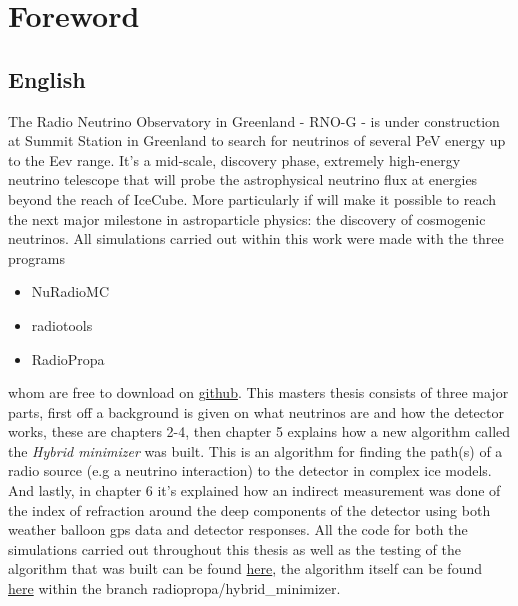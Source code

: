\documentclass[11pt,a4paper,faculty=we,language=en,doctype=report]{cls/ugent-doc}
\renewcommand{\ULthickness}{2pt} %
\begin{document}

\maketitle
\renewcommand{\ULthickness}{1pt}

\newpage
{\hypersetup{hidelinks}\tableofcontents} %
\newpage


\chapter{Foreword}
\section*{English}
The Radio Neutrino Observatory in Greenland - RNO-G - is under construction at
Summit Station in Greenland to search for neutrinos of several PeV energy up to
the Eev range. It's a mid-scale, discovery phase, extremely high-energy
neutrino telescope that will probe the astrophysical neutrino flux at energies
beyond the reach of IceCube.  More particularly if will make it possible to
reach the next major milestone in astroparticle physics: the discovery of
cosmogenic neutrinos.
\vspace{0.5cm}
All simulations carried out within this work were made with the three programs 
\begin{itemize}
	\item NuRadioMC
	\item radiotools
	\item RadioPropa
\end{itemize}
whom are free to download on \href{https://github.com/nu-radio}{github}.  This
masters thesis consists of three major parts, first off a background is given
on what neutrinos are and how the detector works, these are chapters 2-4, then
chapter 5 explains how a new algorithm called the \textit{Hybrid minimizer} was
built. This is an algorithm for finding the path(s) of a radio source (e.g a neutrino interaction)
to the detector in complex ice models. And lastly, in chapter 6 it's explained
how an indirect measurement was done of the index of refraction around the deep
components of the detector using both weather balloon gps data and detector
responses.
All the code for both the simulations carried out throughout this thesis as well
as the testing of the algorithm that was built can be found \href{https://github.com/arthuradriaens-code/projects-mt}{here},
the algorithm itself can be found \href{https://github.com/arthuradriaens-code/NuRadioMC}{here}
within the branch radiopropa/hybrid\_minimizer.
\end{document}
